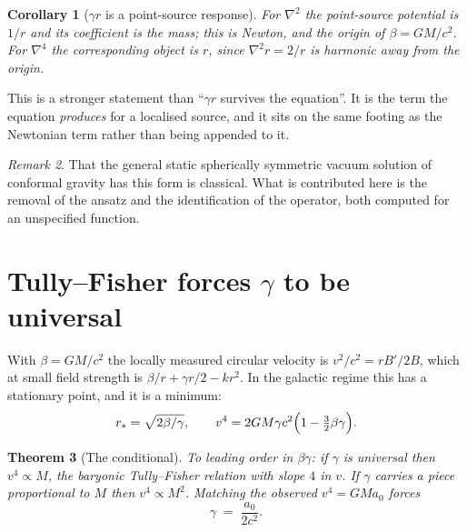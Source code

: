 \documentclass[11pt]{article}
\newtheorem{theorem}{Theorem}[section]
\newtheorem{corollary}[theorem]{Corollary}
\theoremstyle{definition}
\theoremstyle{remark}
\newtheorem{remark}[theorem]{Remark}
\begin{document}
\begin{corollary}[\(\gamma r\) is a point-source response]
For \(\nabla^{2}\) the point-source potential is \(1/r\) and its coefficient
is the mass; this is Newton, and the origin of \(\beta=GM/c^{2}\).  For
\(\nabla^{4}\) the corresponding object is \(r\), since \(\nabla^{2}r=2/r\)
is harmonic away from the origin.
\end{corollary}

This is a stronger statement than ``\(\gamma r\) survives the equation''.  It
is the term the equation \emph{produces} for a localised source, and it sits
on the same footing as the Newtonian term rather than being appended to it.

\begin{remark}
That the general static spherically symmetric vacuum solution of conformal
gravity has this form is classical.  What is contributed here is the removal
of the ansatz and the identification of the operator, both computed for an
unspecified function.
\end{remark}

\section{Tully--Fisher forces \(\gamma\) to be universal}
\label{sec:tf}

With \(\beta=GM/c^{2}\) the locally measured circular velocity is
\(v^{2}/c^{2}=rB'/2B\), which at small field strength is
\(\beta/r+\gamma r/2-kr^{2}\).  In the galactic regime this has a stationary
point, and it is a minimum:
\[
  r_{*}=\sqrt{2\beta/\gamma},
  \qquad
  v^{4}=2GM\gamma c^{2}\Bigl(1-\tfrac{3}{2}\beta\gamma\Bigr).
\]

\begin{theorem}[The conditional]
\label{thm:tf}
To leading order in \(\beta\gamma\): if \(\gamma\) is universal then
\(v^{4}\propto M\), the baryonic Tully--Fisher relation with slope \(4\) in
\(v\).  If \(\gamma\) carries a piece proportional to \(M\) then
\(v^{4}\propto M^{2}\).  Matching the observed \(v^{4}=GMa_{0}\) forces
\[
  \gamma \;=\; \frac{a_{0}}{2c^{2}}.
\]
\end{theorem}
\end{document}
